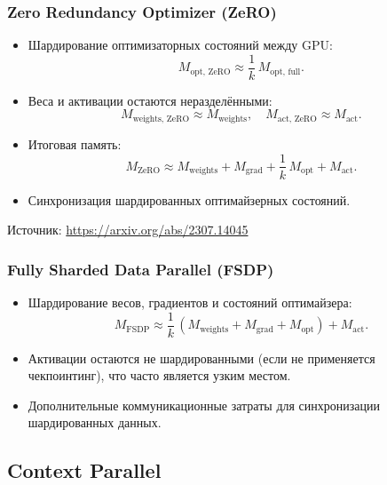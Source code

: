\begin{frame}
  \frametitle{Zero Redundancy Optimizer (ZeRO)}
  \begin{itemize}
    \item Шардирование оптимизаторных состояний между GPU:
    \[
      M_{\text{opt, ZeRO}} \approx \frac{1}{k}\, M_{\text{opt, full}}.
    \]
    \item Веса и активации остаются неразделёнными:
    \[
      M_{\text{weights, ZeRO}} \approx M_{\text{weights}}, \quad M_{\text{act, ZeRO}} \approx M_{\text{act}}.
    \]
    \item Итоговая память:
    \[
      M_{\text{ZeRO}} \approx M_{\text{weights}} + M_{\text{grad}} + \frac{1}{k}\, M_{\text{opt}} + M_{\text{act}}.
    \]
    \item Синхронизация шардированных оптимайзерных состояний.
  \end{itemize}
  \vspace{0.5cm}
  \begin{flushright}
    \tiny Источник: \url{https://arxiv.org/abs/2307.14045}
  \end{flushright}
\end{frame}

\begin{frame}
  \frametitle{Fully Sharded Data Parallel (FSDP)}
  \begin{itemize}
    \item Шардирование весов, градиентов и состояний оптимайзера:
    \[
      M_{\text{FSDP}} \approx \frac{1}{k}\, \left( M_{\text{weights}} + M_{\text{grad}} + M_{\text{opt}} \right) + M_{\text{act}}.
    \]
    \item Активации остаются не шардированными (если не применяется чекпоинтинг), что часто является узким местом.
    \item Дополнительные коммуникационные затраты для синхронизации шардированных данных.
  \end{itemize}
\end{frame}

\subsection{Context Parallel}

